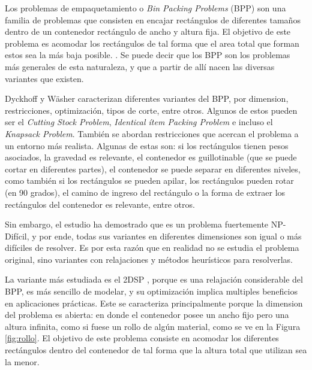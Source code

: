 \documentclass[letter, 10pt]{article}
\begin{document}
Los problemas de empaquetamiento o \textit{Bin Packing Problems} (BPP) son una familia de problemas que consisten en encajar rectángulos de diferentes tamaños dentro de un contenedor rectángulo de ancho y altura fija. El objetivo de este problema es acomodar los rectángulos de tal forma que el area total que forman estos sea la más baja posible. \cite{dowsland1991Packing} \cite{chung82Packing}. Se puede decir que los BPP son los problemas más generales de esta naturaleza, y que a partir de allí nacen las diversas variantes que existen.

Dyckhoff \cite{dyckhoff1990Typo} y Wäsher \cite{wascher2007Typo} caracterizan diferentes variantes del BPP, por dimension, restricciones, optimización, tipos de corte, entre otros. Algunos de estos pueden ser el \textit{Cutting Stock Problem}, \textit{Identical ítem Packing Problem} e incluso el \textit{Knapsack Problem}. También se abordan restricciones que acercan el problema a un entorno más realista. Algunas de estas son: si los rectángulos tienen pesos asociados, la gravedad es relevante, el contenedor es guillotinable (que se puede cortar en diferentes partes), el contenedor se puede separar en diferentes niveles, como también si los rectángulos se pueden apilar, los rectángulos pueden rotar (en 90 grados), el camino de ingreso del rectángulo o la forma de extraer los rectángulos del contenedor es relevante, entre otros.

Sin embargo, el estudio ha demostrado que es un problema fuertemente NP-Difícil, y por ende, todas sus variantes en diferentes dimensiones son igual o más difíciles de resolver. \cite{gilmore1961linear} \cite{hochbaum1985approximation} Es por esta razón que en realidad no se estudia el problema original, sino variantes con relajaciones y métodos heurísticos para resolverlas.

La variante más estudiada es el 2DSP \cite{dyckhoff1990Typo}, porque es una relajación considerable del BPP, es más sencillo de modelar, y su optimización implica multiples beneficios en aplicaciones prácticas. Este se caracteriza principalmente porque la dimension del problema es abierta: en donde el contenedor posee un ancho fijo pero una altura infinita, como si fuese un rollo de algún material, como se ve en la Figura \ref{fig:rollo}. El objetivo de este problema consiste en acomodar los diferentes rectángulos dentro del contenedor de tal forma que la altura total que utilizan sea la menor. \cite{lodi2002Survey}
\end{document}
